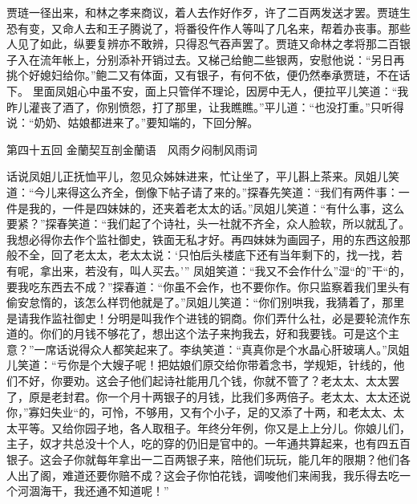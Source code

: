 \documentclass[12pt,oneside]{book}
\begin{document}
贾琏一径出来，和林之孝来商议，着人去作好作歹，许了二百两发送才罢。贾琏生恐有变，又命人去和王子腾说了，将番役仵作人等叫了几名来，帮着办丧事。那些人见了如此，纵要复辨亦不敢辨，只得忍气吞声罢了。贾琏又命林之孝将那二百银子入在流年帐上，分别添补开销过去。又梯己给鲍二些银两，安慰他说：“另日再挑个好媳妇给你。”鲍二又有体面，又有银子，有何不依，便仍然奉承贾琏，不在话下。
里面凤姐心中虽不安，面上只管佯不理论，因房中无人，便拉平儿笑道：“我昨儿灌丧了酒了，你别愤怨，打了那里，让我瞧瞧。”平儿道：“也没打重。”只听得说：“奶奶、姑娘都进来了。”要知端的，下回分解。



 
第四十五回  金蘭契互剖金蘭语　风雨夕闷制风雨词


话说凤姐儿正抚恤平儿，忽见众姊妹进来，忙让坐了，平儿斟上茶来。凤姐儿笑道：“今儿来得这么齐全，倒像下帖子请了来的。”探春先笑道：“我们有两件事：一件是我的，一件是四妹妹的，还夹着老太太的话。”凤姐儿笑道：“有什么事，这么要紧？”探春笑道：“我们起了个诗社，头一社就不齐全，众人脸软，所以就乱了。我想必得你去作个监社御史，铁面无私才好。再四妹妹为画园子，用的东西这般那般不全，回了老太太，老太太说：‘只怕后头楼底下还有当年剩下的，找一找，若有呢，拿出来，若没有，叫人买去。’”
凤姐笑道：“我又不会作什么”湿“的”干“的，要我吃东西去不成？”探春道：“你虽不会作，也不要你作。你只监察着我们里头有偷安怠惰的，该怎么样罚他就是了。”凤姐儿笑道：“你们别哄我，我猜着了，那里是请我作监社御史！分明是叫我作个进钱的铜商。你们弄什么社，必是要轮流作东道的。你们的月钱不够花了，想出这个法子来拘我去，好和我要钱。可是这个主意？”一席话说得众人都笑起来了。李纨笑道：“真真你是个水晶心肝玻璃人。”凤姐儿笑道：“亏你是个大嫂子呢！把姑娘们原交给你带着念书，学规矩，针线的，他们不好，你要劝。这会子他们起诗社能用几个钱，你就不管了？老太太、太太罢了，原是老封君。你一个月十两银子的月钱，比我们多两倍子。老太太、太太还说你，”寡妇失业“的，可怜，不够用，又有个小子，足的又添了十两，和老太太、太太平等。又给你园子地，各人取租子。年终分年例，你又是上上分儿。你娘儿们，主子，奴才共总没十个人，吃的穿的仍旧是官中的。一年通共算起来，也有四五百银子。这会子你就每年拿出一二百两银子来，陪他们玩玩，能几年的限期？他们各人出了阁，难道还要你赔不成？这会子你怕花钱，调唆他们来闹我，我乐得去吃一个河涸海干，我还通不知道呢！”
\end{document}
